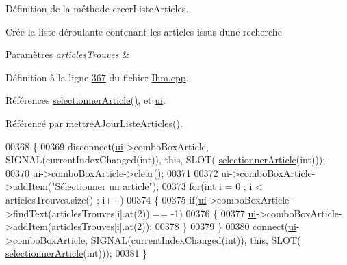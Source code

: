 Définition de la méthode creer\+Liste\+Articles. 

Crée la liste déroulante contenant les articles issus d\textquotesingle{}une recherche 
\begin{DoxyParams}{Paramètres}
{\em articles\+Trouves} & \\
\hline
\end{DoxyParams}


Définition à la ligne \hyperlink{_ihm_8cpp_source_l00367}{367} du fichier \hyperlink{_ihm_8cpp_source}{Ihm.\+cpp}.



Références \hyperlink{_ihm_8cpp_source_l00291}{selectionner\+Article()}, et \hyperlink{_ihm_8h_source_l00099}{ui}.



Référencé par \hyperlink{_ihm_8cpp_source_l00276}{mettre\+A\+Jour\+Liste\+Articles()}.


\begin{DoxyCode}
00368 \{
00369     disconnect(\hyperlink{class_ihm_a0ac5f47856566ceeeca1720109bf70ea}{ui}->comboBoxArticle, SIGNAL(currentIndexChanged(\textcolor{keywordtype}{int})), \textcolor{keyword}{this}, SLOT(
      \hyperlink{class_ihm_ad9b83836021fc8542db033da186cc64c}{selectionnerArticle}(\textcolor{keywordtype}{int})));
00370     \hyperlink{class_ihm_a0ac5f47856566ceeeca1720109bf70ea}{ui}->comboBoxArticle->clear();
00371 
00372     \hyperlink{class_ihm_a0ac5f47856566ceeeca1720109bf70ea}{ui}->comboBoxArticle->addItem(\textcolor{stringliteral}{"Sélectionner un article"});
00373     \textcolor{keywordflow}{for}(\textcolor{keywordtype}{int} i = 0 ; i < articlesTrouves.size() ; i++)
00374     \{
00375         \textcolor{keywordflow}{if}(\hyperlink{class_ihm_a0ac5f47856566ceeeca1720109bf70ea}{ui}->comboBoxArticle->findText(articlesTrouves[i].at(2)) == -1)
00376         \{
00377             \hyperlink{class_ihm_a0ac5f47856566ceeeca1720109bf70ea}{ui}->comboBoxArticle->addItem(articlesTrouves[i].at(2));
00378         \}
00379     \}
00380     connect(\hyperlink{class_ihm_a0ac5f47856566ceeeca1720109bf70ea}{ui}->comboBoxArticle, SIGNAL(currentIndexChanged(\textcolor{keywordtype}{int})), \textcolor{keyword}{this}, SLOT(
      \hyperlink{class_ihm_ad9b83836021fc8542db033da186cc64c}{selectionnerArticle}(\textcolor{keywordtype}{int})));
00381 \}
\end{DoxyCode}
\mbox{\label{class_ihm_a4c4b8c870f639fba192a3c6eff52883d}} 
